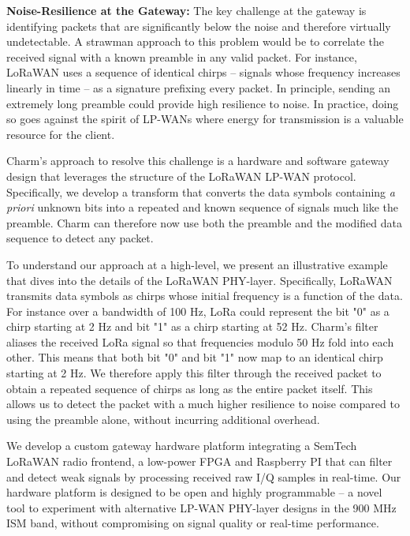 
\noindent \textbf{Noise-Resilience at the Gateway:} The key challenge at the gateway is
identifying packets that are significantly below the noise and therefore
virtually undetectable. A strawman approach to this problem would be to
correlate the received signal with a known preamble in any valid packet. For
instance, LoRaWAN uses a sequence of identical chirps -- signals whose
frequency increases linearly in time -- as a signature prefixing every packet.
In principle, sending an extremely long preamble could provide high resilience
to noise. In practice, doing so goes against the spirit of LP-WANs where
energy for transmission is a valuable resource for the client.

Charm's approach to resolve this challenge is a hardware and software gateway
design that leverages the structure of the LoRaWAN LP-WAN protocol.
Specifically, we develop a transform that converts the data symbols containing
\textit{a priori} unknown bits into a repeated and known sequence of signals
much like the preamble. Charm can therefore now use both the preamble and the
modified data sequence to detect any packet.

To understand our approach at a high-level, we present an illustrative example
that dives into the details of the LoRaWAN PHY-layer. Specifically, LoRaWAN
transmits data symbols as chirps whose initial frequency is a function of the
data. For instance over a bandwidth of 100 Hz, LoRa could represent the bit
"0" as a chirp starting at 2 Hz and bit "1" as a chirp starting at 52 Hz.
Charm's filter aliases the received LoRa signal so that frequencies modulo 50
Hz fold into each other. This means that both bit "0" and bit "1" now map to
an identical chirp starting at 2 Hz. We therefore apply this filter through
the received packet to obtain a repeated sequence of chirps as long as the
entire packet itself. This allows us to detect the packet with a much higher
resilience to noise compared to using the preamble alone, without incurring
additional overhead.

We develop a custom gateway hardware platform integrating a SemTech LoRaWAN
radio frontend, a low-power FPGA and Raspberry PI that can filter and detect
weak signals by processing received raw I/Q samples in real-time. Our hardware
platform is designed to be open and highly programmable -- a novel tool to
experiment with alternative LP-WAN PHY-layer designs in the 900 MHz ISM band,
without compromising on signal quality or real-time performance. 

